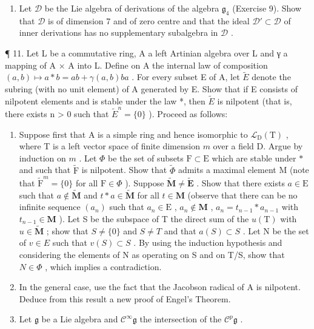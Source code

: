 \begin{enumerate}
\def\labelenumi{\arabic{enumi}.}
\setcounter{enumi}{9}
\tightlist
\item
  Let \(\mathcal{D}\) be the Lie algebra of derivations of the algebra \(\mathfrak{g}_4\) (Exercise 9). Show that \(\mathcal{D}\) is of dimension 7 and of zero centre and that the ideal \(\mathcal{D}' \subset \mathcal{D}\) of inner derivations has no supplementary subalgebra in \(\mathcal{D}\) .
\end{enumerate}

¶ 11. Let L be a commutative ring, A a left Artinian algebra over L and γ a mapping of A × A into L. Define on A the internal law of composition \((a, b) \mapsto a * b = ab + \gamma(a, b)ba\) . For every subset E of A, let \(\tilde{E}\) denote the subring (with no unit element) of A generated by E. Show that if E consists of nilpotent elements and is stable under the law *, then \(\tilde{E}\) is nilpotent (that is, there exists n \textgreater{} 0 such that \(\tilde{E}^{n} = \{0\}\) ). Proceed as follows:

\begin{enumerate}
\def\labelenumi{\arabic{enumi}.}
\item
  Suppose first that A is a simple ring and hence isomorphic to \(\mathcal{L}_{\mathrm{D}}(\mathrm{T})\) , where T is a left vector space of finite dimension \(m\) over a field D. Argue by induction on \(m\) . Let \(\Phi\) be the set of subsets \(\mathrm{F} \subset \mathrm{E}\) which are stable under \(*\) and such that \(\tilde{\mathrm{F}}\) is nilpotent. Show that \(\tilde{\Phi}\) admits a maximal element M (note that \(\tilde{\mathrm{F}}^m = \{0\}\) for all \(\mathrm{F} \in \Phi\) ). Suppose \(\tilde{\mathbf{M}} \neq \tilde{\mathbf{E}}\) . Show that there exists \(a \in \mathrm{E}\) such that \(a \notin \tilde{\mathbf{M}}\) and \(t * a \in \tilde{\mathbf{M}}\) for all \(t \in \mathbf{M}\) (observe that there can be no infinite sequence \((a_n)\) such that \(a_n \in \mathrm{E}\) , \(a_n \notin \mathbf{M}\) , \(a_n = t_{n-1} * a_{n-1}\) with \(t_{n-1} \in \mathbf{M}\) ). Let S be the subspace of T the direct sum of the \(u(\mathrm{T})\) with \(u \in \tilde{\mathbf{M}}\) ; show that \(S \neq \{0\}\) and \(S \neq T\) and that \(a(S) \subset S\) . Let N be the set of \(v \in E\) such that \(v(S) \subset S\) . By using the induction hypothesis and considering the elements of N as operating on S and on T/S, show that \(N \in \Phi\) , which implies a contradiction.
\item
  In the general case, use the fact that the Jacobson radical of A is nilpotent. Deduce from this result a new proof of Engel's Theorem.
\item
  Let \(\mathfrak{g}\) be a Lie algebra and \(\mathcal{C}^{\infty}\mathfrak{g}\) the intersection of the \(\mathcal{C}^p\mathfrak{g}\) .
\end{enumerate}

